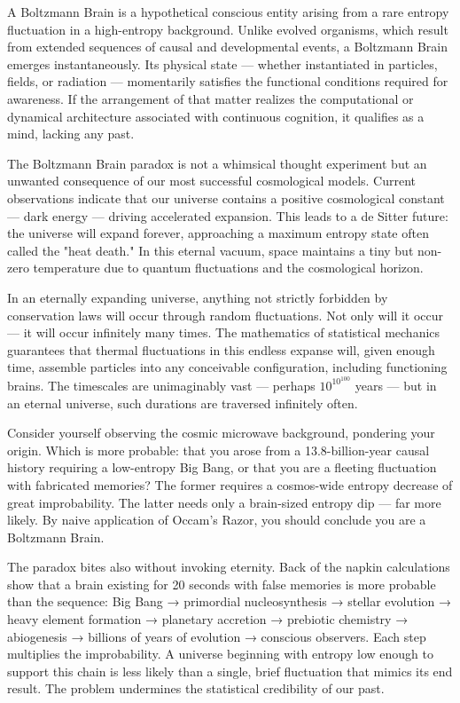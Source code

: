 A Boltzmann Brain is a hypothetical conscious entity arising from a rare entropy fluctuation in a high-entropy background. Unlike evolved organisms, which result from extended sequences of causal and developmental events, a Boltzmann Brain emerges instantaneously. Its physical state — whether instantiated in particles, fields, or radiation — momentarily satisfies the functional conditions required for awareness. If the arrangement of that matter realizes the computational or dynamical architecture associated with continuous cognition, it qualifies as a mind, lacking any past.

The Boltzmann Brain paradox is not a whimsical thought experiment but an unwanted consequence of our most successful cosmological models. Current observations indicate that our universe contains a positive cosmological constant — dark energy — driving accelerated expansion. This leads to a de Sitter future: the universe will expand forever, approaching a maximum entropy state often called the "heat death." In this eternal vacuum, space maintains a tiny but non-zero temperature due to quantum fluctuations and the cosmological horizon.

In an eternally expanding universe, anything not strictly forbidden by conservation laws will occur through random fluctuations. Not only will it occur — it will occur infinitely many times. The mathematics of statistical mechanics guarantees that thermal fluctuations in this endless expanse will, given enough time, assemble particles into any conceivable configuration, including functioning brains. The timescales are unimaginably vast — perhaps $10^{10^{100}}$ years — but in an eternal universe, such durations are traversed infinitely often.

Consider yourself observing the cosmic microwave background, pondering your origin. Which is more probable: that you arose from a 13.8-billion-year causal history requiring a low-entropy Big Bang, or that you are a fleeting fluctuation with fabricated memories? The former requires a cosmos-wide entropy decrease of great improbability. The latter needs only a brain-sized entropy dip — far more likely. By naive application of Occam's Razor, you should conclude you are a Boltzmann Brain.

The paradox bites also without invoking eternity. Back of the napkin calculations show that a brain existing for 20 seconds with false memories is more probable than the sequence: Big Bang → primordial nucleosynthesis → stellar evolution → heavy element formation → planetary accretion → prebiotic chemistry → abiogenesis → billions of years of evolution → conscious observers. Each step multiplies the improbability. A universe beginning with entropy low enough to support this chain is less likely than a single, brief fluctuation that mimics its end result. The problem undermines the statistical credibility of our past.

